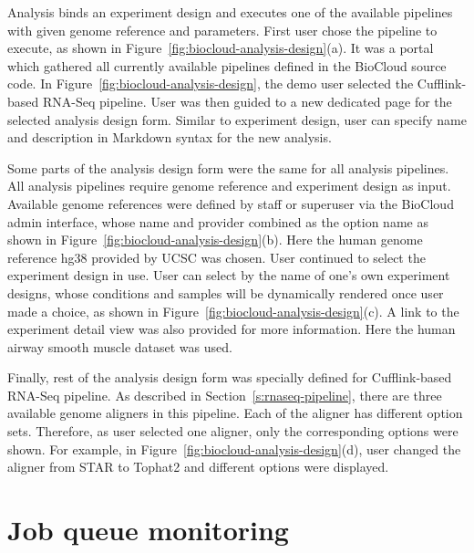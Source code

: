 

Analysis binds an experiment design and executes one of the available pipelines
with given genome reference and parameters. First user chose the pipeline to
execute, as shown in Figure~\ref{fig:biocloud-analysis-design}(a). It was a
portal which gathered all currently available pipelines defined in the BioCloud
source code. In Figure~\ref{fig:biocloud-analysis-design}, the demo user
selected the Cufflink-based RNA-Seq pipeline. User was then guided to a new
dedicated page for the selected analysis design form. Similar to experiment
design, user can specify name and description in Markdown syntax for the
new analysis.

Some parts of the analysis design form were the same for all analysis
pipelines. All analysis pipelines require genome reference and experiment
design as input. Available genome references were defined by staff or superuser
via the BioCloud admin interface, whose name and provider combined as the
option name as shown in Figure~\ref{fig:biocloud-analysis-design}(b). Here the
human genome reference hg38 provided by UCSC was chosen. User continued to
select the experiment design in use. User can select by the name of one's own
experiment designs, whose conditions and samples will be dynamically rendered
once user made a choice, as shown in
Figure~\ref{fig:biocloud-analysis-design}(c). A link to the experiment detail
view was also provided for more information. Here the human airway smooth
muscle dataset was used.

Finally, rest of the analysis design form was specially defined for
Cufflink-based RNA-Seq pipeline. As described in
Section~\ref{s:rnaseq-pipeline}, there are three available genome aligners in
this pipeline. Each of the aligner has different option sets. Therefore, as
user selected one aligner, only the corresponding options were shown. For
example, in Figure~\ref{fig:biocloud-analysis-design}(d), user changed the
aligner from STAR to Tophat2 and different options were displayed.



\section{Job queue monitoring}




